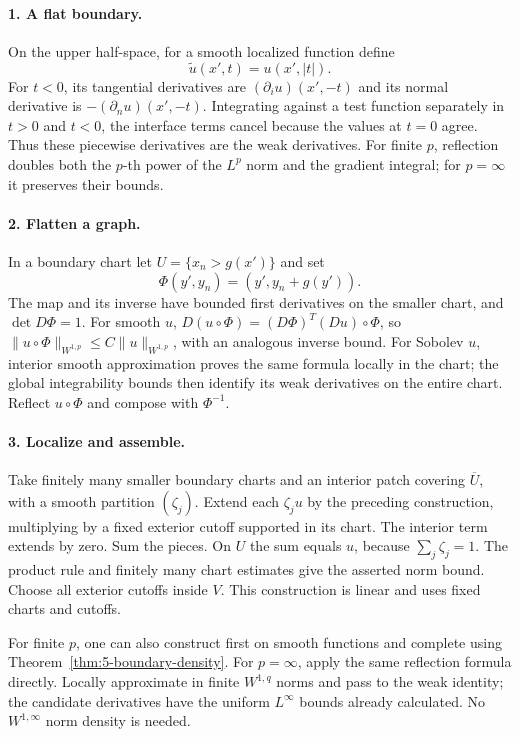 \begin{expandedproof}
\paragraph{1. A flat boundary.}
On the upper half-space, for a smooth localized function define
\[
 \widetilde u(x',t)=u(x',|t|).
\]
For $t<0$, its tangential derivatives are
$(\partial_i u)(x',-t)$ and its normal derivative is
$-(\partial_n u)(x',-t)$. Integrating against a test function separately
in $t>0$ and $t<0$, the interface terms cancel because the values at
$t=0$ agree. Thus these piecewise derivatives are the weak derivatives.
For finite $p$, reflection doubles both the $p$-th power of the $L^p$
norm and the gradient integral; for $p=\infty$ it preserves their bounds.

\paragraph{2. Flatten a graph.}
In a boundary chart let $U=\{x_n>g(x')\}$ and set
\[
 \Phi(y',y_n)=(y',y_n+g(y')).
\]
The map and its inverse have bounded first derivatives on the smaller
chart, and $\det D\Phi=1$. For smooth $u$,
$D(u\circ\Phi)=(D\Phi)^T(Du)\circ\Phi$, so
$\|u\circ\Phi\|_{W^{1,p}}\leq C\|u\|_{W^{1,p}}$, with an analogous
inverse bound. For Sobolev $u$, interior smooth approximation proves
the same formula locally in the chart; the global integrability bounds
then identify its weak derivatives on the entire chart.
Reflect $u\circ\Phi$ and compose with $\Phi^{-1}$.

\paragraph{3. Localize and assemble.}
Take finitely many smaller boundary charts and an interior patch covering
$\overline U$, with a smooth partition $(\zeta_j)$.
Extend each $\zeta_j u$ by the preceding construction, multiplying by
a fixed exterior cutoff supported in its chart. The interior term extends
by zero. Sum the pieces. On $U$ the sum equals $u$, because
$\sum_j\zeta_j=1$. The product rule and finitely many chart estimates
give the asserted norm bound. Choose all exterior cutoffs inside $V$.
This construction is linear and uses fixed charts and cutoffs.

For finite $p$, one can also construct first on smooth functions and
complete using Theorem~\ref{thm:5-boundary-density}. For $p=\infty$,
apply the same reflection formula directly. Locally approximate in
finite $W^{1,q}$ norms and pass to the weak identity; the candidate
derivatives have the uniform $L^\infty$ bounds already calculated.
No $W^{1,\infty}$ norm density is needed.
\end{expandedproof}
\Needspace{45mm}


